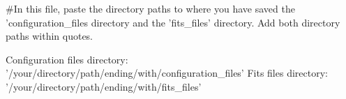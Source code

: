 #In this file, paste the directory paths to where you have saved the 'configuration_files directory and the 'fits_files' directory. Add both directory paths within quotes.

Configuration files directory: '/your/directory/path/ending/with/configuration_files'
Fits files directory: '/your/directory/path/ending/with/fits_files'